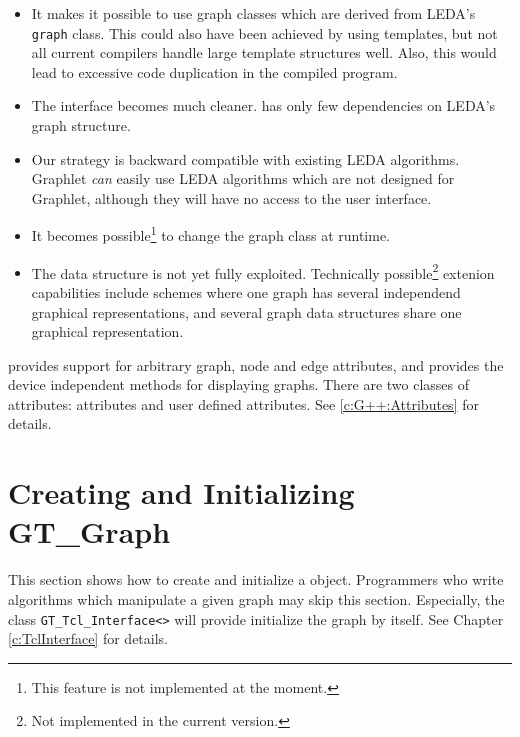 \documentclass[twoside,fleqn]{report}
\begin{document}
\begin{itemize}
  
  \item It makes it possible to use graph classes which are
  derived from LEDA's \texttt{graph} class. This could also have
  been achieved by using templates, but not all current compilers
  handle large template structures well. Also, this would lead to
  excessive code duplication in the compiled program.

  \item The interface becomes much cleaner.   has only few 
  dependencies on LEDA's graph structure.

  \item Our strategy is backward compatible with existing LEDA 
  algorithms.  Graphlet \emph{can} easily use LEDA algorithms which 
  are not designed for Graphlet, although they will have no access to 
  the user interface.
  
  \item It becomes possible\footnote{This feature is not
    implemented at the moment.} to change the graph class at
  runtime.
  
  \item The data structure is not yet fully exploited.
  Technically possible\footnote{Not implemented in the current
    version.} extenion capabilities include schemes where one
  graph has several independend graphical representations, and
  several graph data structures share one graphical
  representation.

\end{itemize}

 provides support for arbitrary graph, node and edge
attributes, and provides the device independent methods for
displaying graphs. There are two classes of attributes:
\Graphlet{} attributes and user defined attributes. See 
\ref{c:G++:Attributes} for details.

%
%
%

\section{Creating and Initializing GT\_Graph}
\label{s:CreatingAndInitializingGraph}

This section shows how to create and initialize a  object.  
Programmers who write algorithms which manipulate a given graph may 
skip this section.  Especially, the class \verb|GT_Tcl_Interface<>| 
will provide initialize the graph by itself.  See Chapter 
\ref{c:TclInterface} for details.
\end{document}
